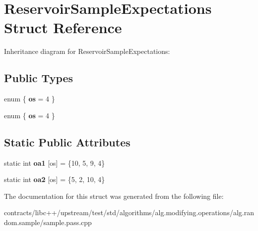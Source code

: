 \hypertarget{struct_reservoir_sample_expectations}{}\section{Reservoir\+Sample\+Expectations Struct Reference}
\label{struct_reservoir_sample_expectations}


Inheritance diagram for Reservoir\+Sample\+Expectations\+:
\subsection*{Public Types}
\begin{DoxyCompactItemize}
\item 
\mbox{\label{struct_reservoir_sample_expectations_ae6c5e597ec8fb48ce6c073dd74802829}} 
enum \{ {\bfseries os} = 4
 \}
\item 
\mbox{\label{struct_reservoir_sample_expectations_a7aefb5460d34915dc6d354e7e9eec031}} 
enum \{ {\bfseries os} = 4
 \}
\end{DoxyCompactItemize}
\subsection*{Static Public Attributes}
\begin{DoxyCompactItemize}
\item 
\mbox{\label{struct_reservoir_sample_expectations_a35857a20c4200b2df8dcc6ed8c57990b}} 
static int {\bfseries oa1} \mbox{[}os\mbox{]} = \{10, 5, 9, 4\}
\item 
\mbox{\label{struct_reservoir_sample_expectations_a64c79f32ae3692c0915a36dca03c751d}} 
static int {\bfseries oa2} \mbox{[}os\mbox{]} = \{5, 2, 10, 4\}
\end{DoxyCompactItemize}


The documentation for this struct was generated from the following file\+:\begin{DoxyCompactItemize}
\item 
contracts/libc++/upstream/test/std/algorithms/alg.\+modifying.\+operations/alg.\+random.\+sample/sample.\+pass.\+cpp\end{DoxyCompactItemize}
